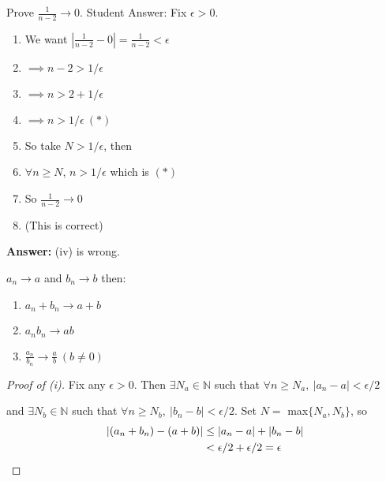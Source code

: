 \begin{clicker}
Prove $\frac{1}{n-2} \to 0$. Student Answer:
Fix $\epsilon >0$.
\begin{enumerate}
	\item We want $|\frac{1}{n-2} - 0| = \frac{1}{n-2} < \epsilon$
	\item $\implies n-2 > 1/\epsilon$
	\item $\implies n > 2 + 1/\epsilon$
	\item $\implies n > 1/\epsilon ~(*)$
	\item So take $N > 1/\epsilon$, then
	\item $\forall n \geq N$, $n > 1/\epsilon$ which is $(*)$
	\item So $\frac{1}{n-2} \to 0$
	\item (This is correct)
\end{enumerate}

\textbf{Answer:} (iv) is wrong. 
	
\end{clicker}


\begin{theorem}\label{thm1}
$a_n \to a$ and $b_n \to b$ then:\begin{enumerate}
\item $a_n+b_n \to a+b$
\item $a_nb_n \to ab$
\item $\frac{a_n}{b_n} \to \frac{a}{b} ~(b \neq 0)$
\end{enumerate}
\end{theorem}
\begin{proof}[Proof of (i)]
Fix any $\epsilon >0$. Then $\exists N_a \in \mathbb{N}$ such that $\forall n\geq N_a,~ |a_n	 - a| < \epsilon/2$ 

and $\exists N_b \in \mathbb{N}$ such that $\forall n \geq N_b,~ |b_n - b| < \epsilon/2$. Set $N =$ max$\{N_a,N_b\}$, so 
\[\begin{aligned}|(a_n + b_n) - (a+b)| &\leq |a_n -a| + |b_n -b| \\
	 &< \epsilon/2 + \epsilon/2 = \epsilon \qedhere
\end{aligned}\]
\end{proof}

